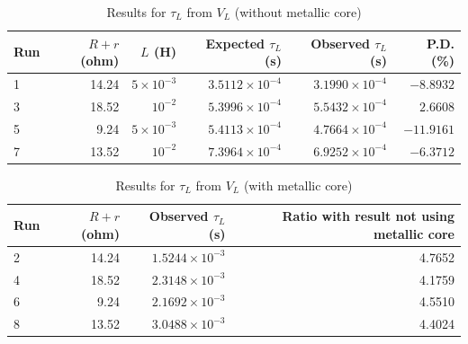 \begin{table}[ht!]
    \begin{center}
        \begin{tabular}{|l|r|r|r|r|r|}
            \hline
            Run & $R+r$ (ohm) & $L$ (H) & Expected $\tau_{L}$ (s) & Observed $\tau_{L}$ (s) & P.D. (\%) \\
            \hline
            1 & 14.24 & $5 \times 10^{-3}$ & $3.5112 \times 10^{-4}$ & $3.1990 \times 10^{-4}$ & $-8.8932$ \\
            3 & 18.52 & $10^{-2}$ & $5.3996 \times 10^{-4}$ & $5.5432 \times 10^{-4}$ & $2.6608$ \\
            5 & 9.24 & $5 \times 10^{-3}$ & $5.4113 \times 10^{-4}$ & $4.7664 \times 10^{-4}$ & $-11.9161$ \\
            7 & 13.52 & $10^{-2}$ & $7.3964 \times 10^{-4}$ & $6.9252 \times 10^{-4}$ & $-6.3712$ \\
            \hline
        \end{tabular}
    \end{center}
    \caption{Results for $\tau_{L}$ from $V_{L}$ (without metallic core)}
\end{table}
%
\begin{table}[ht!]
    \begin{center}
        \begin{tabular}{|l|r|r|r|}
            \hline
            Run & $R+r$ (ohm) & Observed $\tau_{L}$ (s) & Ratio with result not using metallic core \\
            \hline
            2 & 14.24 & $1.5244 \times 10^{-3}$ & 4.7652 \\
            4 & 18.52 & $2.3148 \times 10^{-3}$ & 4.1759 \\
            6 & 9.24 & $2.1692 \times 10^{-3}$ & 4.5510 \\
            8 & 13.52 & $3.0488 \times 10^{-3}$ & 4.4024 \\
            \hline
        \end{tabular}
    \end{center}
    \caption{Results for $\tau_{L}$ from $V_{L}$ (with metallic core)}
\end{table}
%
\newpage
